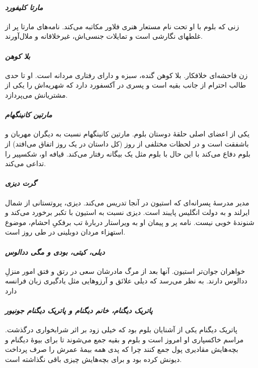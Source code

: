 \documentclass[12pt]{book}
\newcommand{\noun}[1]{\textit{\textcolor{black!70}{#1}}}
\begin{document}
    \paragraph{\noun{مارتا کلیفورد}\protect{}}
    زنی که بلوم با او تحت نام مستعار هنری فلاور مکاتبه می‌کند. نامه‌های مارتا پر از غلطهای نگارشی است و تمایلات جنسی‌اش، غیرخلاقانه و ملال‌آورند.
    \paragraph{\noun{بلا کوهن}\protect{}}
    زن فاحشه‌ای خلافکار. بلا کوهن گنده، سبزه و دارای رفتاری مردانه است. او تا حدی طالب احترام از جانب بقیه است و پسری در آکسفورد دارد که شهریه‌اش را یکی از مشتریانش می‌پردازد.
    \paragraph{\noun{مارتین کانینگهام}\protect{}}
    یکی از اعضای اصلی حلقۀ دوستان بلوم. مارتین کانینگهام نسبت به دیگران مهربان و باشفقت است و در لحظات مختلفی از روز (کل داستان در یک روز اتفاق می‌افتد) از بلوم دفاع می‌کند با این حال با بلوم مثل یک بیگانه رفتار می‌کند. قیافه او، شکسپیر را تداعی می‌کند.
    \paragraph{\noun{گرت دیزی}\protect{}}
    مدیر مدرسۀ پسرانه‌ای که استیون در آنجا تدریس می‌کند. دیزی، پروتستانی از شمال ایرلند و به دولت انگلیس پایبند است. دیزی نسبت به استیون با تکبر برخورد می‌کند و شنوندۀ خوبی نیست. نامه پر و پیمان او به ویراستار دربارۀ تب برفکیِ احشام، موضوع استهزاء مردان دوبلینی در طی روز است.
    \paragraph{\noun{دیلی، کیتی، بودی و مگی ددالوس}\protect{}}
    خواهران جوان‌تر استیون. آنها بعد از مرگ مادرشان سعی در رتق و فتق امور منزلِ ددالوس دارند. به نظر می‌رسد که دیلی علائق و آرزوهایی مثل یادگیری زبان فرانسه دارد
    \paragraph{\noun{پاتریک دیگنام، خانم دیگنام و پاتریک دیگنام جونیور}\protect{}}
    پاتریک دیگنام یکی از آشنایان بلوم بود که خیلی زود بر اثر شرابخواری درگذشت. مراسم خاکسپاری او امروز است و بلوم و بقیه جمع می‌شوند تا برای بیوۀ دیگنام و بچه‌هایش مقادیری پول جمع کنند چرا که پدی همه بیمۀ عمرش را صرف پرداخت دیونش کرده بود و برای بچه‌هایش چیزی باقی نگذاشته است.
\end{document}
